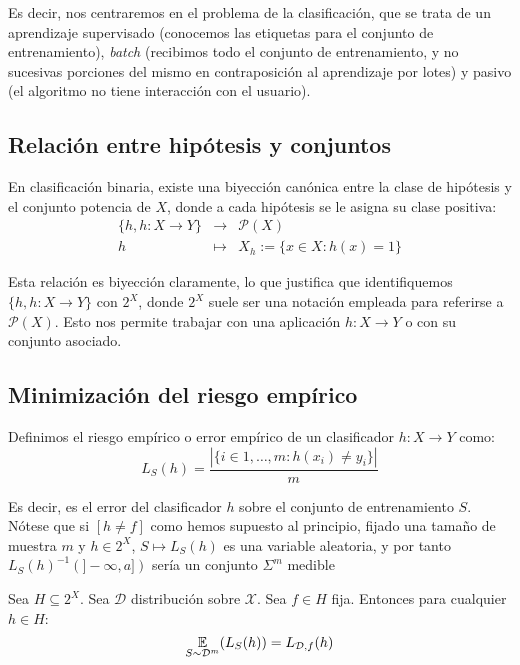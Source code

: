 Es decir, nos centraremos en el problema de la clasificación, que se trata de un aprendizaje supervisado (conocemos las etiquetas para
el conjunto de entrenamiento), \emph{batch} (recibimos todo el conjunto de entrenamiento, y no sucesivas porciones del mismo en
contraposición al aprendizaje por lotes) y pasivo (el algoritmo no tiene interacción con el usuario).

\subsection{Relación entre hipótesis y conjuntos}
\label{biyeccion-canonica} 
En clasificación binaria, existe una biyección canónica entre la clase de hipótesis y el conjunto potencia de $X$, donde
a cada hipótesis se le asigna su clase positiva:
\begin{equation*}
 \begin{array}{rcl} 
  \{h, h:X \rightarrow Y\} & \longrightarrow & \mathcal{P}(X) \\
  h & \longmapsto & X_h := \{x\in X: h(x) = 1\}
 \end{array}
\end{equation*}

Esta relación es biyección claramente, lo que justifica que identifiquemos $\{h, h:X \rightarrow Y\}$ con $2^X$, donde $2^X$ 
suele ser una notación empleada para referirse a $\mathcal{P}(X)$. Esto nos permite trabajar con una aplicación
$h:X \rightarrow Y$ o con su conjunto asociado.

\subsection{Minimización del riesgo empírico}

\begin{definition}
Definimos el riesgo empírico o error empírico de un clasificador $h:X \rightarrow Y$ como:
\[
  L_S(h) = \frac{|\{i\in {1,\ldots, m}: h(x_i) \neq y_i\}|}{m}
\]
\end{definition}

Es decir, es el error del clasificador $h$ sobre el conjunto de entrenamiento $S$. Nótese que si $[h\neq f]$ como hemos
supuesto al principio, fijado una tamaño de muestra $m$ y $h\in 2^X$, $S \mapsto L_S(h)$ es una variable aleatoria, y por
tanto $L_S(h)^{-1}(]-\infty, a])$ sería un conjunto $\Sigma^m$ medible

\begin{fact}
Sea $H\subseteq 2^X$. Sea $\mathcal{D}$ distribución sobre $\mathcal{X}$. Sea $f \in H$ fija. Entonces para
cualquier $h\in H$:
\[
  \underset{S\sim \mathcal{D}^m}{\mathbb{E}}(L_S(h)) = L_{\mathcal{D},f}(h)
\]
\end{fact}

